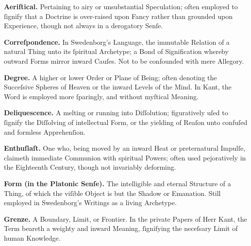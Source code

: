 \documentclass[12pt]{book}
\begin{document}
\vspace{1.2em}

\noindent
\textbf{Aeriſtical.} Pertaining to airy or unsubstantial Speculation; often employed to ſignify that a Doctrine is over-raised upon Fancy rather than grounded upon Experience, though not always in a derogatory Senſe.

\vspace{0.8em}

\noindent
\textbf{Correſpondence.} In Swedenborg’s Language, the immutable Relation of a natural Thing unto its ſpiritual Archetype; a Bond of Signification whereby outward Forms mirror inward Cauſes. Not to be confounded with mere Allegory.

\vspace{0.8em}

\noindent
\textbf{Degree.} A higher or lower Order or Plane of Being; often denoting the Succeſsive Spheres of Heaven or the inward Levels of the Mind. In Kant, the Word is employed more ſparingly, and without myſtical Meaning.

\vspace{0.8em}

\noindent
\textbf{Deliquescence.} A melting or running into Diſſolution; figuratively uſed to ſignify the Diſſolving of intellectual Form, or the yielding of Reaſon unto confuſed and formless Apprehenſion.

\vspace{0.8em}

\noindent
\textbf{Enthuſiaſt.} One who, being moved by an inward Heat or preternatural Impulſe, claimeth immediate Communion with spiritual Powers; often used pejoratively in the Eighteenth Century, though not invariably deforming.

\vspace{0.8em}

\noindent
\textbf{Form (in the Platonic Senſe).} The intelligible and eternal Structure of a Thing, of which the viſible Object is but the Shadow or Emanation. Still employed in Swedenborg’s Writings as a living Archetype.

\vspace{0.8em}

\noindent
\textbf{Grenze.} A Boundary, Limit, or Frontier. In the private Papers of Herr Kant, the Term beareth a weighty and inward Meaning, ſignifying the neceſsary Limit of human Knowledge.

\vspace{0.8em}
\end{document}
